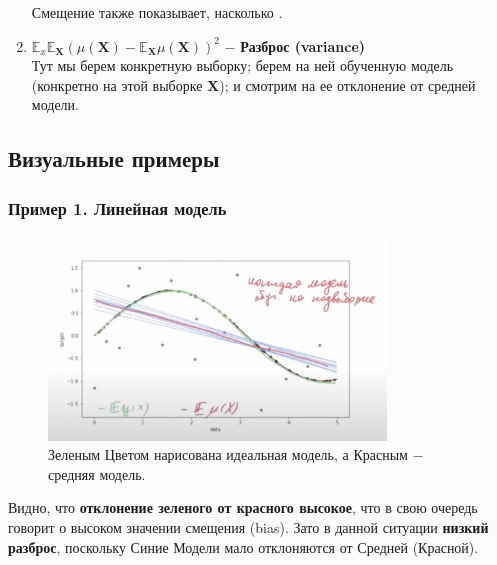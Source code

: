 \begin{enumerate}

                Смещение также показывает, насколько .\\


                \item $\mathbb{E}_x\mathbb{E}_\mathbf{X}( \mu(\mathbf{X}) - \mathbb{E}_\mathbf{X}\mu(\mathbf{X}) )^2$ $-$ \textbf{Разброс (variance)}\\

                Тут мы берем конкретную выборку; берем на ней обученную модель (конкретно на этой выборке $\mathbf{X}$); и смотрим на ее отклонение от средней модели. 

            \end{enumerate}


    \subsection{Визуальные примеры}

        \subsubsection{Пример 1. Линейная модель}
             \begin{figure}[H]
                \centering
                \includegraphics[width=0.8\textwidth]{images/9lecture/ex1.png}
                \caption{Зеленым Цветом нарисована идеальная модель, а Красным $-$ средняя модель.}
            \end{figure}

            Видно, что \textbf{отклонение зеленого от красного высокое}, что в свою очередь говорит о высоком значении смещения (bias). Зато в данной ситуации \textbf{низкий разброс}, поскольку Синие Модели мало отклоняются от Средней (Красной).

